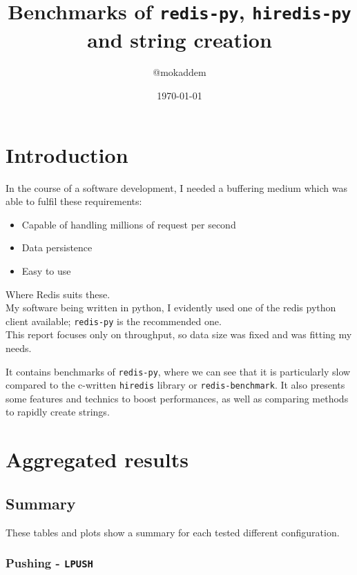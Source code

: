 \documentclass[a4paper, 11pt]{report}
\title{Benchmarks of \texttt{redis-py}, \texttt{hiredis-py} and string creation}
\author{@mokaddem}
\date{\today}
\begin{document}
\maketitle
\tableofcontents
\chapter*{Introduction}
In the course of a software development, I needed a buffering medium which was able to fulfil these requirements:
\begin{itemize}
    \item Capable of handling millions of request per second
    \item Data persistence
    \item Easy to use
\end{itemize}
Where Redis suits these.\\

My software being written in python, I evidently used one of the redis python client available; \texttt{redis-py} is the recommended one.\\

This report focuses only on throughput, so data size was fixed and was fitting my needs.

It contains benchmarks of \texttt{redis-py}, where we can see that it is particularly slow compared to the c-written \texttt{hiredis} library or \texttt{redis-benchmark}. It also presents some features and technics to boost performances, as well as comparing methods to rapidly create strings.

\chapter{Aggregated results}
\section{Summary}
These tables and plots show a summary for each tested different configuration.
\subsection{Pushing - \texttt{LPUSH}}
\end{document}

